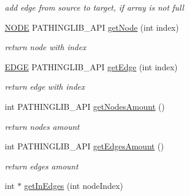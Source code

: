 \begin{DoxyCompactItemize}
\begin{DoxyCompactList}\small\item\em add edge from source to target, if array is not full \end{DoxyCompactList}\item 
\hyperlink{class_pathing_lib_1_1_n_o_d_e}{N\+O\+DE} P\+A\+T\+H\+I\+N\+G\+L\+I\+B\+\_\+\+A\+PI \hyperlink{class_pathing_lib_1_1_graph_a4c9d25ad34b11f0f843a6a4f356776c9}{get\+Node} (int index)\hypertarget{class_pathing_lib_1_1_graph_a4c9d25ad34b11f0f843a6a4f356776c9}{}\label{class_pathing_lib_1_1_graph_a4c9d25ad34b11f0f843a6a4f356776c9}

\begin{DoxyCompactList}\small\item\em return node with index \end{DoxyCompactList}\item 
\hyperlink{class_pathing_lib_1_1_e_d_g_e}{E\+D\+GE} P\+A\+T\+H\+I\+N\+G\+L\+I\+B\+\_\+\+A\+PI \hyperlink{class_pathing_lib_1_1_graph_add1badb2122286d8ed9199b7dfcc5f9a}{get\+Edge} (int index)\hypertarget{class_pathing_lib_1_1_graph_add1badb2122286d8ed9199b7dfcc5f9a}{}\label{class_pathing_lib_1_1_graph_add1badb2122286d8ed9199b7dfcc5f9a}

\begin{DoxyCompactList}\small\item\em return edge with index \end{DoxyCompactList}\item 
int P\+A\+T\+H\+I\+N\+G\+L\+I\+B\+\_\+\+A\+PI \hyperlink{class_pathing_lib_1_1_graph_a72a922e8494e776b164d911e7f2541c8}{get\+Nodes\+Amount} ()\hypertarget{class_pathing_lib_1_1_graph_a72a922e8494e776b164d911e7f2541c8}{}\label{class_pathing_lib_1_1_graph_a72a922e8494e776b164d911e7f2541c8}

\begin{DoxyCompactList}\small\item\em return nodes amount \end{DoxyCompactList}\item 
int P\+A\+T\+H\+I\+N\+G\+L\+I\+B\+\_\+\+A\+PI \hyperlink{class_pathing_lib_1_1_graph_a838c2cbb3fd9ea6cf8bc9e1eda69e73f}{get\+Edges\+Amount} ()\hypertarget{class_pathing_lib_1_1_graph_a838c2cbb3fd9ea6cf8bc9e1eda69e73f}{}\label{class_pathing_lib_1_1_graph_a838c2cbb3fd9ea6cf8bc9e1eda69e73f}

\begin{DoxyCompactList}\small\item\em return edges amount \end{DoxyCompactList}\item 
int $\ast$ \hyperlink{class_pathing_lib_1_1_graph_a0150276e986e7483cdb94c6145602aab}{get\+In\+Edges} (int node\+Index)\hypertarget{class_pathing_lib_1_1_graph_a0150276e986e7483cdb94c6145602aab}{}\label{class_pathing_lib_1_1_graph_a0150276e986e7483cdb94c6145602aab}


\end{DoxyCompactItemize}
